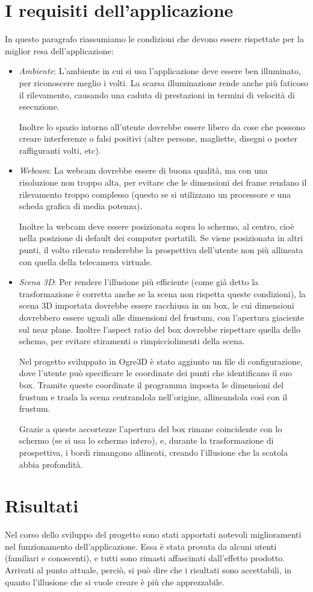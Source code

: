 \section{I requisiti dell'applicazione}
In questo paragrafo riassumiamo le condizioni che devono essere rispettate per la miglior resa dell'applicazione:
\begin{itemize}
\item \textit{Ambiente}: L'ambiente in cui si usa l'applicazione deve essere ben illuminato, per riconoscere meglio i volti. La scarsa illuminazione rende anche più faticoso il rilevamento, causando una caduta di prestazioni in termini di velocità di esecuzione.

Inoltre lo spazio intorno all'utente dovrebbe essere libero da cose che possono creare interferenze o falsi positivi (altre persone, magliette, disegni o poster raffiguranti volti, etc).

\item \textit{Webcam}: La webcam dovrebbe essere di buona qualità, ma con una risoluzione non troppo alta, per evitare che le dimensioni dei frame rendano il rilevamento troppo complesso (questo se si utilizzano un processore e una scheda grafica di media potenza).

Inoltre la webcam deve essere posizionata sopra lo schermo, al centro, cioè nella posizione di default dei computer portatili. Se viene posizionata in altri punti, il volto rilevato renderebbe la prospettiva dell'utente non più allineata con quella della telecamera virtuale.

\item \textit{Scena 3D}: Per rendere l'illusione più efficiente (come già detto la trasformazione è corretta anche se la scena non rispetta queste condizioni), la scena 3D importata dovrebbe essere racchiusa in un box, le cui dimensioni dovrebbero essere uguali alle dimensioni del frustum, con l'apertura giaciente sul near plane. Inoltre l'aspect ratio del box dovrebbe rispettare quella dello schemo, per evitare stiramenti o rimpicciolimenti della scena.

Nel progetto sviluppato in Ogre3D è stato aggiunto un file di configurazione, dove l'utente può specificare le coordinate dei punti che identificano il suo box. Tramite queste coordinate il programma imposta le dimensioni del frustum e trasla la scena centrandola nell'origine, allineandola così con il frustum. 

Grazie a queste accortezze l'apertura del box rimane coincidente con lo schermo (se si usa lo schermo intero), e, durante la trasformazione di prospettiva, i bordi rimangono allineati, creando l'illusione che la scatola abbia profondità.
\end{itemize}

\section{Risultati}
Nel corso dello sviluppo del progetto sono stati apportati notevoli miglioramenti nel funzionamento dell'applicazione. Essa è stata provata da alcuni utenti (familiari e conoscenti), e tutti sono rimasti affascinati dall'effetto prodotto. Arrivati al punto attuale, perciò, si può dire che i risultati sono accettabili, in quanto l'illusione che si vuole creare è più che apprezzabile.

